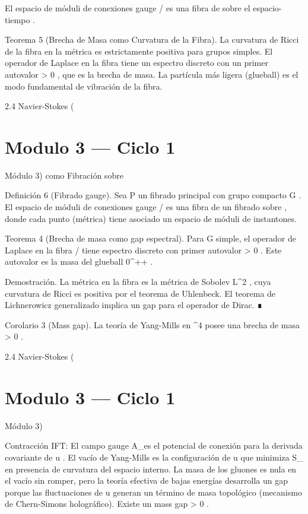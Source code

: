 \documentclass[12pt,twoside]{book}
\begin{document}
El espacio de móduli de conexiones gauge  /  es una fibra de    sobre el espacio-tiempo   .

Teorema 5 (Brecha de Masa como Curvatura de la Fibra). La curvatura de Ricci de la fibra en la métrica    es estrictamente positiva para grupos simples. El operador de Laplace en la fibra tiene un espectro discreto con un primer autovalor  \Delta > 0 , que es la brecha de masa. La partícula más ligera (glueball) es el modo fundamental de vibración de la fibra.

2.4 Navier-Stokes (

\chapter{Modulo 3 — Ciclo 1}
Módulo 3) como Fibración sobre   

Definición 6 (Fibrado gauge). Sea  P \to {}  un fibrado principal con grupo compacto  G . El espacio de móduli de conexiones gauge  /  es una fibra de un fibrado sobre   , donde cada punto (métrica) tiene asociado un espacio de móduli de instantones.

Teorema 4 (Brecha de masa como gap espectral). Para  G  simple, el operador de Laplace en la fibra  /  tiene espectro discreto con primer autovalor  \Delta > 0 . Este autovalor es la masa del glueball  0^{++} .

Demostración. La métrica en la fibra es la métrica de Sobolev  L^2 , cuya curvatura de Ricci es positiva por el teorema de Uhlenbeck. El teorema de Lichnerowicz generalizado implica un gap para el operador de Dirac. ∎

Corolario 3 (Mass gap). La teoría de Yang-Mills en  ^4  posee una brecha de masa  \Delta > 0 .

2.4 Navier-Stokes (

\chapter{Modulo 3 — Ciclo 1}
Módulo 3)

Contracción IFT: El campo gauge  A_\mu  es el potencial de conexión para la derivada covariante de  u . El vacío de Yang-Mills es la configuración de  u  que minimiza  S_{}  en presencia de curvatura del espacio interno. La masa de los gluones es nula en el vacío sin romper, pero la teoría efectiva de bajas energías desarrolla un gap porque las fluctuaciones de  u  generan un término de masa topológico (mecanismo de Chern-Simons holográfico). Existe un mass gap  \Delta > 0 .
\end{document}

